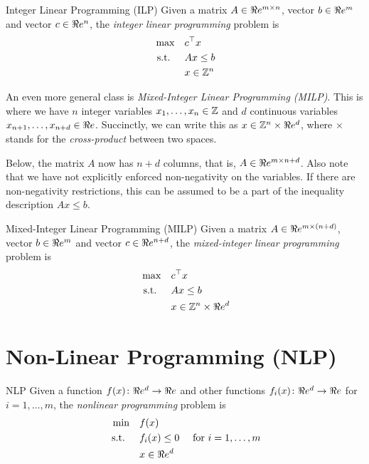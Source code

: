 

\begin{general}{Integer Linear Programming (ILP)}{\npcomplete}
Given a matrix $A \in \Re e^{m\times n}$, vector $b \in \Re e^m$ and vector $c \in \Re e^n$, the \emph{integer linear programming} problem is
\begin{equation}
\label{eq:ILP}
\begin{split}
\max \quad & c^\top x\\
\mbox{ s.t. }  \quad & Ax \leq b\\
& x \in {\mathbb{Z}}^n
\end{split}
\end{equation}
\end{general}


An even more general class is \emph{Mixed-Integer Linear Programming (MILP)}.  This is where we have $n$ integer variables $x_1, \dots, x_n \in {\mathbb{Z}}$ and $d$ continuous variables $x_{n+1}, \dots, x_{n+d} \in \Re e$.  Succinctly, we can write this as $x \in {\mathbb{Z}}^n \times \Re e^d$, where $\times$ stands for the \emph{cross-product} between two spaces.   

Below, the matrix $A$ now has $n+d$ columns, that is, $A \in \Re e^{m \times n+d}$.  Also note that we have not explicitly enforced non-negativity on the variables.  If there are non-negativity restrictions, this can be assumed to be a part of the inequality description $Ax \leq b$.
\begin{general}{Mixed-Integer Linear Programming (MILP)}{\npcomplete}
Given a matrix $A \in \Re e^{m\times (n+d)}$, vector $b \in \Re e^m$ and vector $c \in \Re e^{n+d}$, the \emph{mixed-integer linear programming} problem is
\begin{equation}
\label{eq:ILP}
\begin{split}
\max \quad & c^\top x\\
\mbox{ s.t. }  \quad & Ax \leq b\\
& x \in {\mathbb{Z}}^n \times \Re e^d
\end{split}
\end{equation}
\end{general}

\section{Non-Linear Programming (NLP)}
\begin{general}{NLP}{\nphard}
Given a function $f(x)\colon \Re e^d \to \Re e$ and other functions $f_i(x)\colon \Re e^d \to \Re e$ for $i=1, \dots, m$,  the \emph{nonlinear programming} problem is
\begin{equation}
\label{eq:convex-programming}
\begin{split}
\min \quad & f(x)\\
\mbox{ s.t. }  \quad & f_i(x) \leq 0  \quad  \mbox{ for } i=1, \dots, m\\
& x \in \Re e^d
\end{split}
\end{equation}
\end{general}


